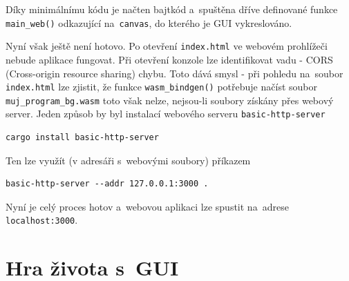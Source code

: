 \documentclass[a4paper, 12pt, twoside]{article} %
\newcommand{\rust}[1]{\texttt{#1}}
\begin{document}
		Díky minimálnímu kódu je načten bajtkód a~spuštěna dříve definované funkce \rust{main_web()} odkazující na~\texttt{canvas}, do kterého je GUI vykreslováno.
		
		Nyní však ještě není hotovo. Po otevření \texttt{index.html} ve webovém prohlížeči nebude aplikace fungovat. Při otevření konzole lze identifikovat vadu - CORS (Cross-origin resource sharing) chybu. Toto dává smysl - při pohledu na~soubor \texttt{index.html} lze zjistit, že funkce \rust{wasm_bindgen()} potřebuje načíst soubor \texttt{muj\_program\_bg.wasm} toto však nelze, nejsou-li soubory získány přes webový server. Jeden způsob by byl instalací webového serveru \texttt{basic-http-server}
		\begin{verbatim}
cargo install basic-http-server
		\end{verbatim}
		
		Ten lze využít (v adresáři s~webovými soubory) příkazem
		\begin{verbatim}
basic-http-server --addr 127.0.0.1:3000 .
		\end{verbatim}
		
		Nyní je celý proces hotov a~webovou aplikaci lze spustit na~adrese \linebreak\texttt{localhost:3000}.\cite{wasm_vid, wasm_gh}


\section{Hra života s~GUI}
\end{document}

